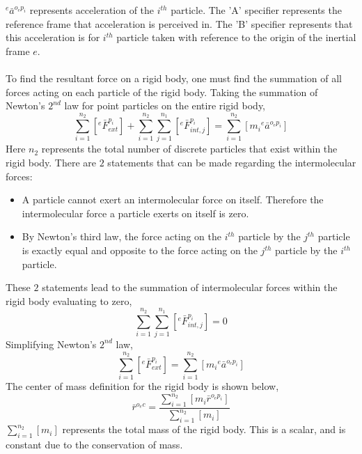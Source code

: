 \\~\\${}^{e}\bar{a}^{o_{e}p_{i}}$ represents acceleration of the $i^{th}$ particle. 
The 'A' specifier represents the reference frame that acceleration is perceived in. 
The 'B' specifier represents that this acceleration is for $i^{th}$ particle taken with reference to the origin of the inertial frame $e$.
\\~\\To find the resultant force on a rigid body, one must find the summation of all forces acting on each particle of the rigid body. 
Taking the summation of Newton's $2^{nd}$ law for point particles on the entire rigid body,
$$\sum^{n_{2}}_{i = 1}\left[{}^{e}\bar{F}^{p_{i}}_{ext}\right] + \sum^{n_{2}}_{i = 1}\sum^{n_{1}}_{j = 1}\left[{}^{e}\bar{F}^{p_{i}}_{int,j}\right] = \sum^{n_{2}}_{i = 1}\left[m_{i}{}^{e}\bar{a}^{o_{e}p_{i}}\right]$$
Here $n_{2}$ represents the total number of discrete particles that exist within the rigid body. 
There are $2$ statements that can be made regarding the intermolecular forces:
\begin{itemize}
    \item A particle cannot exert an intermolecular force on itself. 
Therefore the intermolecular force a particle exerts on itself is zero.
    \item By Newton's third law, the force acting on the $i^{th}$ particle by the $j^{th}$ particle is exactly equal and opposite to the force acting on the $j^{th}$ particle by the $i^{th}$ particle.
\end{itemize}
These $2$ statements lead to the summation of intermolecular forces within the rigid body evaluating to zero,
$$\sum^{n_{2}}_{i = 1}\sum^{n_{1}}_{j = 1}\left[{}^{e}\bar{F}^{p_{i}}_{int,j}\right] = 0$$
Simplifying Newton's $2^{nd}$ law,
\begin{equation}\sum^{n_{2}}_{i = 1}\left[{}^{e}\bar{F}^{p_{i}}_{ext}\right] = \sum^{n_{2}}_{i = 1}\left[m_{i}{}^{e}\bar{a}^{o_{e}p_{i}}\right]\label{mambah-1}\end{equation}
The center of mass definition for the rigid body is shown below,
\begin{equation}
\bar{r}^{o_{e}c} = \frac{\displaystyle \sum^{n_{2}}_{i = 1}\left[m_{i}\bar{r}^{o_{e}p_{i}}\right]}{\displaystyle \sum^{n_{2}}_{i = 1}\left[m_{i}\right]}
\label{Center of Mass Definition}
\end{equation}
$\displaystyle \sum^{n_{2}}_{i = 1}\left[m_{i}\right]$ represents the total mass of the rigid body. 
This is a scalar, and is constant due to the conservation of mass. 
